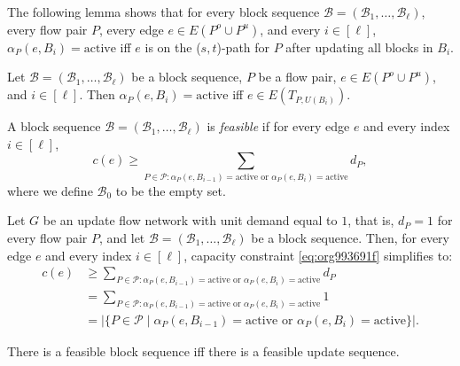 \documentclass[fontsize=11pt,paper=a4]{book}
\begin{document}
The following lemma shows that for every block sequence \(\mathcal{B}=(\mathscr{B}_1,\dots,\mathscr{B}_{\ell})\), every flow pair \(P\), every edge \(e\in E(P^o\cup P^u)\), and every \(i\in[\ell]\), \(\alpha_P(e,B_i)=\mathrm{active}\) iff \(e\) is on the (\(s,t\))-path for \(P\) after updating all blocks in \(B_i\).

\begin{lem}
Let \(\mathcal{B}=(\mathscr{B}_1,\dots,\mathscr{B}_{\ell})\) be a block sequence, \(P\) be a flow pair, \(e\in E(P^o\cup P^u)\), and \(i\in[\ell]\).
Then \(\alpha_P(e,B_i)=\mathrm{active}\) iff \(e\in E(T_{P,U(B_i)})\).
\label{orga8f4cd1}
\end{lem}

\begin{defn}
A block sequence \(\mathcal{B}=(\mathscr{B}_1,\dots,\mathscr{B}_{\ell})\) is \emph{feasible} if for every edge \(e\) and every index \(i\in[\ell]\),
\begin{equation}
\label{eq:org993691f}
c(e)\geq\sum_{P\in\mathcal{P}:\alpha_P(e,B_{i-1})=\mathrm{active}\text{ or }\alpha_P(e,B_i)=\mathrm{active}}d_P,
\end{equation}
where we define \(\mathscr{B}_0\) to be the empty set.
\label{org59b46ca}
\end{defn}

\begin{remark}
Let \(G\) be an update flow network with unit demand equal to \(1\), that is, \(d_P=1\) for every flow pair \(P\), and let \(\mathcal{B}=(\mathscr{B}_1,\dots,\mathscr{B}_{\ell})\) be a block sequence.
Then, for every edge \(e\) and every index \(i\in[\ell]\), capacity constraint \ref{eq:org993691f} simplifies to:
\begin{align*}
c(e)
&\geq\sum_{P\in\mathcal{P}:\alpha_P(e,B_{i-1})=\mathrm{active}\text{ or }\alpha_P(e,B_i)=\mathrm{active}}d_P\\
&=\sum_{P\in\mathcal{P}:\alpha_P(e,B_{i-1})=\mathrm{active}\text{ or }\alpha_P(e,B_i)=\mathrm{active}}1\\
&=\lvert\{P\in\mathcal{P}\mid\alpha_P(e,B_{i-1})=\mathrm{active}\text{ or }\alpha_P(e,B_i)=\mathrm{active}\}\rvert.
\end{align*}
\label{org6243ee5}
\end{remark}

\begin{corollary}
There is a feasible block sequence iff there is a feasible update sequence.
\label{org234090d}
\end{corollary}
\end{document}
